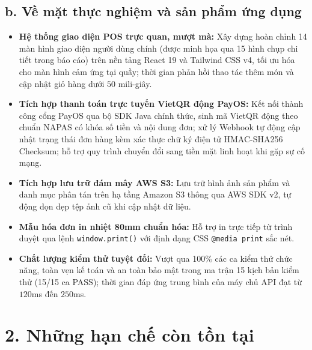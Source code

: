 \subsection*{b. Về mặt thực nghiệm và sản phẩm ứng dụng}
\begin{itemize}[leftmargin=1.5cm]
    \item \textbf{Hệ thống giao diện POS trực quan, mượt mà:} Xây dựng hoàn chỉnh 14 màn hình giao diện người dùng chính (được minh họa qua 15 hình chụp chi tiết trong báo cáo) trên nền tảng React 19 và Tailwind CSS v4, tối ưu hóa cho màn hình cảm ứng tại quầy; thời gian phản hồi thao tác thêm món và cập nhật giỏ hàng dưới $50$ mili-giây.
    \item \textbf{Tích hợp thanh toán trực tuyến VietQR động PayOS:} Kết nối thành công cổng PayOS qua bộ SDK Java chính thức, sinh mã VietQR động theo chuẩn NAPAS có khóa số tiền và nội dung đơn; xử lý Webhook tự động cập nhật trạng thái đơn hàng kèm xác thực chữ ký điện tử HMAC-SHA256 Checksum; hỗ trợ quy trình chuyển đổi sang tiền mặt linh hoạt khi gặp sự cố mạng.
    \item \textbf{Tích hợp lưu trữ đám mây AWS S3:} Lưu trữ hình ảnh sản phẩm và danh mục phân tán trên hạ tầng Amazon S3 thông qua AWS SDK v2, tự động dọn dẹp tệp ảnh cũ khi cập nhật dữ liệu.
    \item \textbf{Mẫu hóa đơn in nhiệt 80mm chuẩn hóa:} Hỗ trợ in trực tiếp từ trình duyệt qua lệnh \texttt{window.print()} với định dạng CSS \texttt{@media print} sắc nét.
    \item \textbf{Chất lượng kiểm thử tuyệt đối:} Vượt qua 100\% các ca kiểm thử chức năng, toàn vẹn kế toán và an toàn bảo mật trong ma trận 15 kịch bản kiểm thử (15/15 ca PASS); thời gian đáp ứng trung bình của máy chủ API đạt từ $120$ms đến $250$ms.
\end{itemize}

\section*{2. Những hạn chế còn tồn tại}
\label{sec:han_che}

